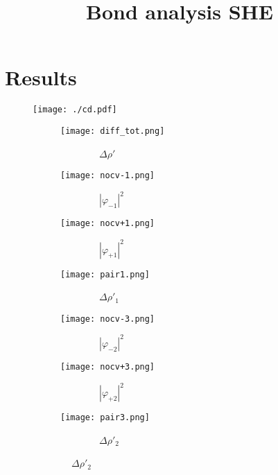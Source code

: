 \documentclass[journal=inoraj,manuscript=article]{achemso}
\title[Bond analysis SHE]
{Bond analysis SHE}
\begin{document}
\section{Results}


\begin{figure} 
\texttt{[image: ./cd.pdf]}

	\caption{}
\end{figure}


\begin{figure}
    \centering
    \centering
    \begin{subfigure}[t]{0.33\textwidth}
        \centering
        \texttt{[image: diff\_tot.png]} 
        \caption*{\ \ \ \ \ \ \ \ $\Delta \rho'$} 
    \end{subfigure}
    \hfill
 
    \vspace{0.0cm}
    \begin{subfigure}[t]{0.32\textwidth}
        \centering
        \texttt{[image: nocv-1.png]} 
        \caption*{\ \ \ \ \ \ \ \ $|\varphi_{-1}|^2$} 
    \end{subfigure}
    \hfill
    \begin{subfigure}[t]{0.32\textwidth}
        \centering
        \texttt{[image: nocv+1.png]} 
        \caption*{\ \ \ \ \ \ \ \ $|\varphi_{+1}|^2$} 
    \end{subfigure}
    \hfill
    \begin{subfigure}[t]{0.32\textwidth}
        \centering
        \texttt{[image: pair1.png]} 
        \caption*{\ \ \ \ \ \ \ \ $\Delta \rho'_1$} 
    \end{subfigure}

    \vspace{0.0cm}
    \begin{subfigure}[t]{0.32\textwidth}
        \centering
        \texttt{[image: nocv-3.png]}
        \caption*{\ \ \ \ \ \ \ \ $|\varphi_{-2}|^2$}
    \end{subfigure}
    \hfill
    \begin{subfigure}[t]{0.32\textwidth}
        \centering
        \texttt{[image: nocv+3.png]}
        \caption*{\ \ \ \ \ \ \ \ $|\varphi_{+2}|^2$}
    \end{subfigure}
    \hfill
    \begin{subfigure}[t]{0.32\textwidth}
        \centering
        \texttt{[image: pair3.png]} 
        \caption*{\ \ \ \ \ \ \ \ $\Delta \rho'_2$} 
    \end{subfigure}


\end{figure}
\end{document}
